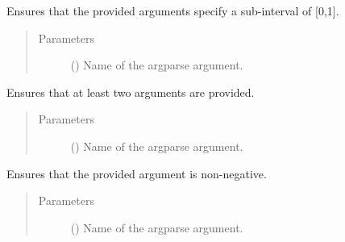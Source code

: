 \documentclass[a4paper,10pt,english]{sphinxhowto}
\begin{document}
\begin{fulllineitems}
\label{\detokenize{utils:utils.argparse_checks.check_interval}}
Ensures that the provided arguments specify a sub-interval of {[}0,1{]}.
\begin{quote}\begin{description}
\item[{Parameters}] \leavevmode
{} () \textendash{} Name of the argparse argument.

\end{description}\end{quote}

\end{fulllineitems}


\begin{fulllineitems}
\label{\detokenize{utils:utils.argparse_checks.check_length}}
Ensures that at least two arguments are provided.
\begin{quote}\begin{description}
\item[{Parameters}] \leavevmode
{} () \textendash{} Name of the argparse argument.

\end{description}\end{quote}

\end{fulllineitems}


\begin{fulllineitems}
\label{\detokenize{utils:utils.argparse_checks.check_non_negative}}
Ensures that the provided argument is non-negative.
\begin{quote}\begin{description}
\item[{Parameters}] \leavevmode
{} () \textendash{} Name of the argparse argument.

\end{description}\end{quote}

\end{fulllineitems}
\end{document}
